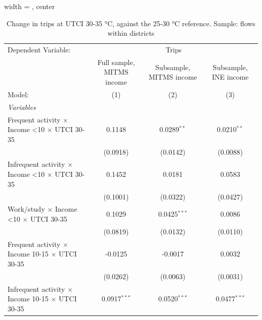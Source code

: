 
\begin{table}[htbp]
   \caption{\label{table_models_abc_30-35} Change in trips at UTCI 30-35 °C, against the 25-30 °C reference. Sample: flows within districts}
   \centering
   \small
   \begin{adjustbox}{width = \textwidth, center}
      \begin{tabular}{lccc}
         \tabularnewline \midrule \midrule
         Dependent Variable: & \multicolumn{3}{c}{Trips}\\
                                                                         & Full sample, MITMS income & Subsample, MITMS income & Subsample, INE income \\   
         Model:                                                          & (1)                       & (2)                     & (3)\\  
         \midrule
         \emph{Variables}\\
         Frequent activity $\times$ Income <10 $\times$ UTCI 30-35       & 0.1148                    & 0.0289$^{**}$           & 0.0210$^{**}$\\   
                                                                         & (0.0918)                  & (0.0142)                & (0.0088)\\   
         Infrequent activity $\times$ Income <10 $\times$ UTCI 30-35     & 0.1452                    & 0.0181                  & 0.0583\\   
                                                                         & (0.1001)                  & (0.0322)                & (0.0427)\\   
         Work/study $\times$ Income <10 $\times$ UTCI 30-35              & 0.1029                    & 0.0425$^{***}$          & 0.0086\\   
                                                                         & (0.0819)                  & (0.0132)                & (0.0110)\\   
         Frequent activity $\times$ Income 10-15 $\times$ UTCI 30-35     & -0.0125                   & -0.0017                 & 0.0032\\   
                                                                         & (0.0262)                  & (0.0063)                & (0.0031)\\   
         Infrequent activity $\times$ Income 10-15 $\times$ UTCI 30-35   & 0.0917$^{***}$            & 0.0520$^{***}$          & 0.0477$^{***}$\\   

\end{tabular}
\end{adjustbox}
\end{table}
